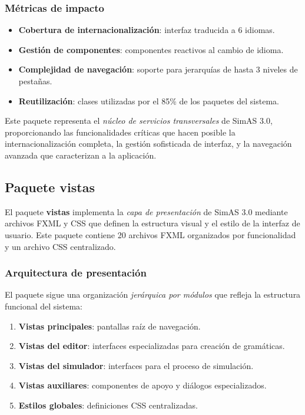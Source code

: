 \subsubsection{Métricas de impacto}

\begin{itemize}
    \item \textbf{Cobertura de internacionalización}: interfaz traducida a 6 idiomas.
    \item \textbf{Gestión de componentes}: componentes reactivos al cambio de idioma.
    \item \textbf{Complejidad de navegación}: soporte para jerarquías de hasta 3 niveles de pestañas.
    \item \textbf{Reutilización}: clases utilizadas por el 85\% de los paquetes del sistema.
\end{itemize}

Este paquete representa el \textit{núcleo de servicios transversales} de SimAS 3.0, proporcionando las funcionalidades críticas que hacen posible la internacionalización completa, la gestión sofisticada de interfaz, y la navegación avanzada que caracterizan a la aplicación.

\subsection{Paquete vistas}

El paquete \textbf{vistas} implementa la \textit{capa de presentación} de SimAS 3.0 mediante archivos FXML y CSS que definen la estructura visual y el estilo de la interfaz de usuario. Este paquete contiene 20 archivos FXML organizados por funcionalidad y un archivo CSS centralizado.

\subsubsection{Arquitectura de presentación}

El paquete sigue una organización \textit{jerárquica por módulos} que refleja la estructura funcional del sistema:

\begin{enumerate}
    \item \textbf{Vistas principales}: pantallas raíz de navegación.
    \item \textbf{Vistas del editor}: interfaces especializadas para creación de gramáticas.
    \item \textbf{Vistas del simulador}: interfaces para el proceso de simulación.
    \item \textbf{Vistas auxiliares}: componentes de apoyo y diálogos especializados.
    \item \textbf{Estilos globales}: definiciones CSS centralizadas.
\end{enumerate}

